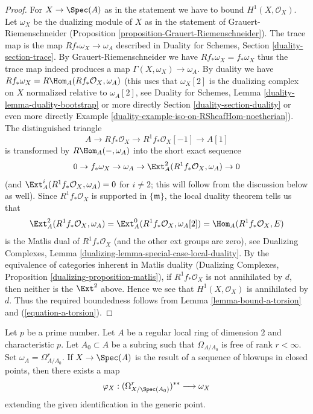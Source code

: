 \begin{proof}
For $X \to \Spec(A)$ as in the statement we have to bound
$H^1(X, \mathcal{O}_X)$. Let $\omega_X$ be the dualizing module
of $X$ as in the statement of Grauert-Riemenschneider
(Proposition \ref{proposition-Grauert-Riemenschneider}).
The trace map is the map $Rf_*\omega_X \to \omega_A$ described
in Duality for Schemes, Section \ref{duality-section-trace}.
By Grauert-Riemenschneider we have $Rf_*\omega_X = f_*\omega_X$
thus the trace map indeed produces a map $\Gamma(X, \omega_X) \to \omega_A$.
By duality we have $Rf_*\omega_X = R\Hom_A(Rf_*\mathcal{O}_X, \omega_A)$
(this uses that $\omega_X[2]$ is the dualizing complex on $X$
normalized relative to $\omega_A[2]$,
see Duality for Schemes, Lemma \ref{duality-lemma-duality-bootstrap}
or more directly Section \ref{duality-section-duality} or even more directly
Example \ref{duality-example-iso-on-RSheafHom-noetherian}).
The distinguished triangle
$$
A \to Rf_*\mathcal{O}_X \to R^1f_*\mathcal{O}_X[-1] \to A[1]
$$
is transformed by $R\Hom_A(-, \omega_A)$ into the short exact sequence
$$
0 \to f_*\omega_X \to \omega_A \to
\Ext_A^2(R^1f_*\mathcal{O}_X, \omega_A) \to 0
$$
(and $\Ext_A^i(R^1f_*\mathcal{O}_X, \omega_A) = 0$ for $i \not = 2$;
this will follow from the discussion below as well).
Since $R^1f_*\mathcal{O}_X$ is supported in $\{\mathfrak m\}$, the
local duality theorem tells us that
$$
\Ext_A^2(R^1f_*\mathcal{O}_X, \omega_A) =
\Ext_A^0(R^1f_*\mathcal{O}_X, \omega_A[2]) =
\Hom_A(R^1f_*\mathcal{O}_X, E)
$$
is the Matlis dual of $R^1f_*\mathcal{O}_X$ (and the other
ext groups are zero), see
Dualizing Complexes, Lemma \ref{dualizing-lemma-special-case-local-duality}.
By the equivalence of categories inherent in Matlis duality
(Dualizing Complexes, Proposition \ref{dualizing-proposition-matlis}),
if $R^1f_*\mathcal{O}_X$ is not annihilated by $d$,
then neither is the $\Ext^2$ above. Hence we see that
$H^1(X, \mathcal{O}_X)$ is annihilated by $d$. Thus the required
boundedness follows from Lemma \ref{lemma-bound-a-torsion} and
(\ref{equation-a-torsion}).
\end{proof}

\begin{lemma}
\label{lemma-compare-differentials-dualizing}
Let $p$ be a prime number.
Let $A$ be a regular local ring of dimension $2$ and characteristic $p$.
Let $A_0 \subset A$ be a subring such that $\Omega_{A/A_0}$ is free
of rank $r < \infty$. Set $\omega_A = \Omega^r_{A/A_0}$. If $X \to \Spec(A)$
is the result of a sequence of blowups in closed points, then
there exists a map
$$
\varphi_X : (\Omega^r_{X/\Spec(A_0)})^{**} \longrightarrow \omega_X
$$
extending the given identification in the generic point.
\end{lemma}

